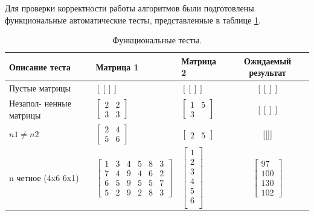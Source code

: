 \documentclass[12pt]{report}
\begin{document}
	Для проверки корректности работы алгоритмов были подготовлены функциональные автоматические тесты, представленные в таблице \ref{tab:test}.
	
	\begin{table}[H]
		\caption{\label{tab:test} Функциональные тесты.}
		\begin{center}
			\begin{tabular}{|p{2cm}|p{3.4cm}|p{3.9cm}|c|}
				\hline
				Описание теста & Матрица 1 & Матрица 2 & Ожидаемый результат \\
				\hline
			    Пустые матрицы & $[[]]$ & $[[]]$ & $[[]]$ \\
				\hline
				Незапол-
				ненные матрицы & 
				$\begin{bmatrix}
					 2 & 2\\
					 3 & 3
				\end{bmatrix}$ & 
			$\begin{bmatrix}
				 1 & 5\\
				 3 & 
			\end{bmatrix}$ & $[[]]$ \\
				\hline
				$n1 \neq n2$ & $
				\begin{bmatrix}
				2 & 4\\
				5 & 6
				\end{bmatrix}$ & 
				$\begin{bmatrix}
				2 & 5
				\end{bmatrix}$ & [[]] \\
				\hline
				n четное (4x6 6x1) & 
				$\begin{bmatrix}
				1 & 3 & 4 & 5 & 8 & 3 \\
				7 & 4 & 9 & 4 & 6 & 2 \\
				6 & 5 & 9 & 5 & 5 & 7 \\
				5 & 2 & 9 & 2 & 8 & 3
				\end{bmatrix}$ & 
				 $\begin{bmatrix}
				 1\\
				 2\\
				 3\\
				 4\\
				 5\\
				 6\\
				 \end{bmatrix}$ & 
				  $\begin{bmatrix}
				  97\\ 
				  100\\ 
				  130\\ 
				  102
				  \end{bmatrix}$ \\

\end{tabular}
\end{center}
\end{table}
\end{document}
